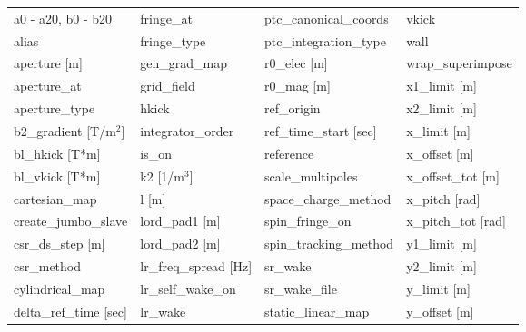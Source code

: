  \begin{tabular}{llll} \toprule
a0 - a20, b0 - b20               & fringe_at                        & ptc_canonical_coords             & vkick                            \\
alias                            & fringe_type                      & ptc_integration_type             & wall                             \\
aperture [m]                     & gen_grad_map                     & r0_elec [m]                      & wrap_superimpose                 \\
aperture_at                      & grid_field                       & r0_mag [m]                       & x1_limit [m]                     \\
aperture_type                    & hkick                            & ref_origin                       & x2_limit [m]                     \\
b2_gradient [T/m$^2$]            & integrator_order                 & ref_time_start [sec]             & x_limit [m]                      \\
bl_hkick [T*m]                   & is_on                            & reference                        & x_offset [m]                     \\
bl_vkick [T*m]                   & k2 [1/m$^3$]                     & scale_multipoles                 & x_offset_tot [m]                 \\
cartesian_map                    & l [m]                            & space_charge_method              & x_pitch [rad]                    \\
create_jumbo_slave               & lord_pad1 [m]                    & spin_fringe_on                   & x_pitch_tot [rad]                \\
csr_ds_step [m]                  & lord_pad2 [m]                    & spin_tracking_method             & y1_limit [m]                     \\
csr_method                       & lr_freq_spread [Hz]              & sr_wake                          & y2_limit [m]                     \\
cylindrical_map                  & lr_self_wake_on                  & sr_wake_file                     & y_limit [m]                      \\
delta_ref_time [sec]             & lr_wake                          & static_linear_map                & y_offset [m]                     \\

\end{tabular}

